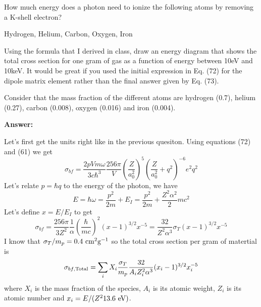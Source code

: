 \documentclass{article}
\newcommand{\rmmat}[1]{\hbox{\rm #1}}
\newcommand{\rmscr}[1]{{\hbox{\rm \scriptsize #1}}}
\begin{document}
\begin{enumerate}
How much energy does a photon need to ionize the following atoms by
removing a K-shell electron?  

Hydrogen, Helium, Carbon, Oxygen, Iron

Using the formula that I derived in class, draw an energy diagram that
shows the total cross section for one gram of gas as a function of
energy between 10eV and 10keV.   It would be great if you used the
initial expression in Eq. (72) for the dipole matrix element rather
than the final answer given by Eq. (73).

Consider that the mass fraction of the different atoms are hydrogen
(0.7), helium (0.27), carbon (0.008), oxygen (0.016) and iron (0.004).

{\bf Answer: }

Let's first get the units right like in the previous quesiton.   Using
equations (72) and (61) we get
\begin{equation}
\sigma_{bf} = \frac{2 p V m \omega}{3 c \hbar^3} 
\frac{256\pi}{V} \left ( \frac{Z}{a_0^2} \right )^5 
\left ( \frac{Z}{a_0^2} + q^2 \right )^{-6} e^2 q^2
\end{equation}
Let's relate $p=\hbar q$ to the energy of the photon, we have
\begin{equation}
E = \hbar \omega = \frac{p^2}{2 m} + E_I = \frac{p^2}{2 m} +
\frac{Z^2 \alpha^2}{2} 
 m c^2
\end{equation}
Let's define $x=E/E_I$ to get
\begin{equation}
\sigma_{bf} = \frac{256 \pi}{3 Z^2} \frac{1}{\alpha} \left (
\frac{\hbar}{m c} \right )^2 ( x - 1 )^{3/2} x^{-5} = \frac{32}{Z^2
  \alpha^3} \sigma_T ( x - 1 )^{3/2} x^{-5} 
\end{equation}
I know that $\sigma_T/m_p = 0.4~\rmmat{cm}^2 \rmmat{g}^{-1}$ so the
total cross section per gram of matertial is
\begin{equation}
\sigma_{bf,\rmscr{Total}} = \sum_i X_i \frac{\sigma_T}{m_p} 
\frac{32}{A_i Z_i^2
  \alpha^3} ( x_i - 1 )^{3/2} x_i^{-5} 
\end{equation}
where $X_i$ is the mass fraction of the species, $A_i$ is its atomic
weight, $Z_i$ is its atomic number and $x_i=E/(Z^2 13.6~\rmmat{eV})$.


\end{enumerate}
\end{document}
